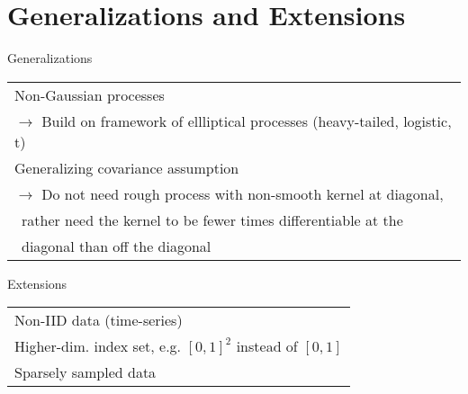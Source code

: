 \section{Generalizations and Extensions}


\begin{frame}{Generalizations}

    \vspace{-1cm}
    \begin{table}[]
    \renewcommand{\arraystretch}{2}
        \begin{tabular}{l}
           Non-Gaussian processes\\
          \quad $\to$ Build on framework of ellliptical processes (heavy-tailed,
          logistic, t)\\\pause
           Generalizing covariance assumption\\
          \quad $\to$ Do not need rough process with non-smooth kernel at
          diagonal,\\[-0.7em]
          \quad\quad\, rather need the kernel to be fewer times differentiable at the\\[-0.7em]
          \quad\quad\, diagonal than off the diagonal
        \end{tabular}
    \end{table}

\end{frame}


\begin{frame}{Extensions}

    \vspace{-1cm}
    \begin{table}[]
    \renewcommand{\arraystretch}{2}
        \begin{tabular}{l}
             Non-IID data (time-series)\\\pause
             Higher-dim. index set, e.g. $[0, 1]^2$ instead of $[0,
            1]$\\\pause
             Sparsely sampled data
        \end{tabular}
    \end{table}

\end{frame}
